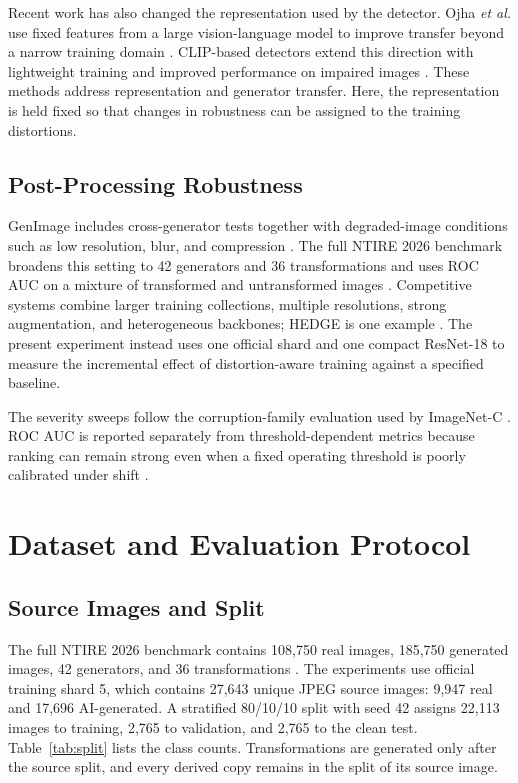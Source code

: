 \documentclass[conference]{IEEEtran}
\begin{document}
Recent work has also changed the representation used by the detector. Ojha
\textit{et al.} use fixed features from a large vision-language model to
improve transfer beyond a narrow training domain \cite{ojha2023universal}.
CLIP-based detectors extend this direction with lightweight training and
improved performance on impaired images \cite{cozzolino2024clip}. These
methods address representation and generator transfer. Here, the
representation is held fixed so that changes in robustness can be assigned to
the training distortions.

\subsection{Post-Processing Robustness}

GenImage includes cross-generator tests together with degraded-image
conditions such as low resolution, blur, and compression
\cite{zhu2023genimage}. The full NTIRE 2026 benchmark broadens this setting to
42 generators and 36 transformations and uses ROC AUC on a mixture of
transformed and untransformed images \cite{gushchin2026ntire}. Competitive
systems combine larger training collections, multiple resolutions, strong
augmentation, and heterogeneous backbones; HEDGE is one example
\cite{wu2026hedge}. The present experiment instead uses one official shard and
one compact ResNet-18 to measure the incremental effect of distortion-aware
training against a specified baseline.

The severity sweeps follow the corruption-family evaluation used by
ImageNet-C \cite{hendrycks2019corruptions}. ROC AUC is reported separately
from threshold-dependent metrics because ranking can remain strong even when
a fixed operating threshold is poorly calibrated under shift
\cite{guo2017calibration,ovadia2019uncertainty}.

\section{Dataset and Evaluation Protocol}
\label{sec:dataset}

\subsection{Source Images and Split}

The full NTIRE 2026 benchmark contains 108,750 real images, 185,750 generated
images, 42 generators, and 36 transformations \cite{gushchin2026ntire}. The
experiments use official training shard 5, which contains 27,643 unique JPEG
source images: 9,947 real and 17,696 AI-generated. A stratified 80/10/10 split
with seed 42 assigns 22,113 images to training, 2,765 to validation, and 2,765
to the clean test. Table~\ref{tab:split} lists the class counts.
Transformations are generated only after the source split, and every derived
copy remains in the split of its source image.
\end{document}
